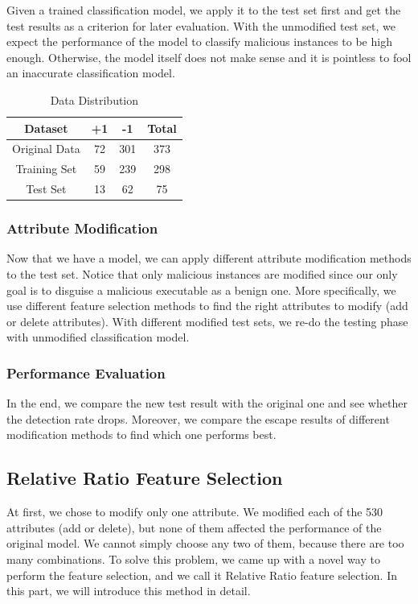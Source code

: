 \documentclass[11pt]{article}
\begin{document}
Given a trained classification model, we apply it to the test set first and get the test results as a criterion for later evaluation. With the unmodified test set, we expect the performance of the model to classify malicious instances to be high enough. Otherwise, the model itself does not make sense and it is pointless to fool an inaccurate classification model.

\begin{table}
\centering
\begin{tabular}{c  c  c c} \hline

Dataset & +1 & -1 & Total\\\hline
{Original Data}& 72 & 301 & 373 \\
{Training Set} & 59 & 239 & 298 \\
{Test Set} & 13 & 62 & 75 \\\hline
\end{tabular}
\caption{Data Distribution} %
\label{tbl:dataset}
\end{table}

\subsubsection{Attribute Modification}
Now that we have a model, we can apply different attribute modification methods to the test set. Notice that only malicious instances are modified since our only goal is to disguise a malicious executable as a benign one. More specifically, we use different feature selection methods to find the right attributes to modify (add or delete attributes). With different modified test sets, we re-do the testing phase with unmodified classification model. 

\subsubsection{Performance Evaluation}
In the end, we compare the new test result with the original one and see whether the detection rate drops. Moreover, we compare the escape results of different modification methods to find which one performs best. 

\subsection{Relative Ratio Feature Selection}
At first, we chose to modify only one attribute. We modified each of the 530 attributes (add or delete), but none of them affected the performance of the original model. We cannot simply choose any two of them, because there are too many combinations. To solve this problem, we came up with a novel way to perform the feature selection, and we call it Relative Ratio feature selection. In this part, we will introduce this method in detail.
\end{document}
